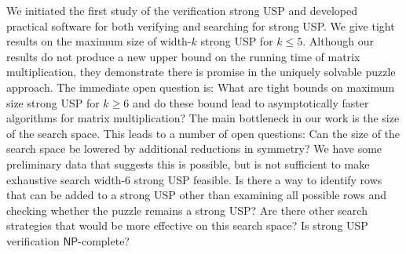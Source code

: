 \documentclass[11pt]{article}
\renewcommand\NP{\ensuremath{\mathsf{NP}}}
\begin{document}
We initiated the first study of the verification strong USP and
developed practical software for both verifying and searching for strong
USP.  We give tight results on the maximum size of width-$k$ strong
USP for $k \le 5$.  Although our results do not produce a new upper
bound on the running time of matrix multiplication, they demonstrate
there is promise in the uniquely solvable puzzle approach.  The
immediate open question is: What are tight bounds on maximum size
strong USP for $k \ge 6$ and do these bound lead to asymptotically
faster algorithms for matrix multiplication?  The main bottleneck in
our work is the size of the search space.  This leads to a number of
open questions: Can the size of the search space be lowered by
additional reductions in symmetry?  We have some preliminary data that
suggests this is possible, but is not sufficient to make exhaustive
search width-6 strong USP feasible.  Is there a way to identify rows
that can be added to a strong USP other than examining all possible
rows and checking whether the puzzle remains a strong USP?  Are there
other search strategies that would be more effective on this search
space?  Is strong USP verification \NP-complete?

 

\appendix
\end{document}
